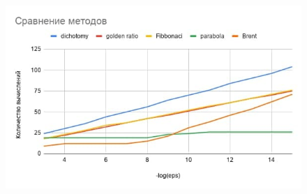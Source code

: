 \documentclass[12pt]{article}
\begin{document}
\begin{figure}[h]
\centering
\includegraphics[width=1\textwidth]{images/new_methods.jpg}
\end{figure}
\end{document}
